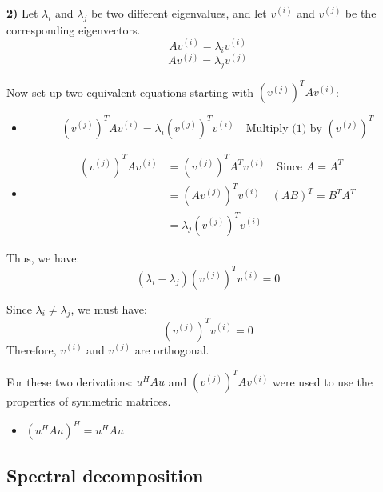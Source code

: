 \begin{derivation}    
    \textbf{2)} Let $\lambda_i$ and $\lambda_j$ be two different eigenvalues, and let $v^{(i)}$ and $v^{(j)}$ be the corresponding eigenvectors. 
    \[
    A v^{(i)} = \lambda_i v^{(i)} \tag{1}
    \]
    \[
    A v^{(j)} = \lambda_j v^{(j)} \tag{2}
    \]
    
    Now set up two equivalent equations starting with $(v^{(j)})^T A v^{(i)}$:
    \begin{itemize}
        \item 
        \[
    (v^{(j)})^T A v^{(i)} = \lambda_i (v^{(j)})^T v^{(i)} \quad \text{Multiply (1) by $(v^{(j)})^T$}
    \]
        \item 
        \begin{align*}
            (v^{(j)})^T A v^{(i)} &= (v^{(j)})^T A^T v^{(i)} \quad \text{Since $A = A^T$} \\ 
            &= (Av^{(j)})^T v^{(i)} \quad \text{$(AB)^T = B^T A^T$} \\
            &= \lambda_j (v^{(j)})^T v^{(i)} 
        \end{align*}
    \end{itemize}
    \vspace{1em}
    
    Thus, we have:
    \[
    (\lambda_i - \lambda_j) (v^{(j)})^T v^{(i)} = 0
    \]
    
    Since $\lambda_i \neq \lambda_j$, we must have:
    \[
    (v^{(j)})^T v^{(i)} = 0
    \]
    Therefore, $v^{(i)}$ and $v^{(j)}$ are orthogonal.
\end{derivation}

\begin{warning}
    For these two derivations: $u^H A u$ and $(v^{(j)})^T A v^{(i)}$ were used to use the properties of symmetric matrices. 
    \begin{itemize}
        \item $(u^H A u)^H = u^H A u$
    \end{itemize}
\end{warning}

\subsection{Spectral decomposition}
